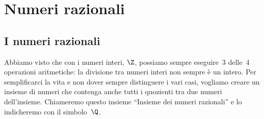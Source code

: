


%


\renewcommand{\cancelto}[3][]
  {\tikz[baseline=(N.base)]{
    \node[main node](N){$#2$};
    \node[label node,#1, anchor=south west] at (N.north east){$#3$};
    \draw[strike out,-latex,#1]  (N.south west) -- (N.north east);
  }
}

\newcommand{\bcancelto}[3][]
  {\tikz[baseline=(N.base)]{
    \node[main node](N){$#2$};
    \node[label node,#1, anchor=north west] at (N.south east){$#3$};
    \draw[strike out,-latex,#1]  (N.north west) -- (N.south east);
  }
}


\chapter{Numeri razionali}

\section{I numeri razionali}
\label{sec:razionali_razionali}

%

Abbiamo visto che con i numeri interi, \(\Z\), possiamo sempre eseguire~3
delle~4 operazioni aritmetiche: la divisione tra numeri interi non sempre è
un intero. Per semplificarci la vita e non dover sempre distinguere i vari
casi, vogliamo creare un insieme di numeri che contenga anche tutti i
quozienti tra due numeri dell'insieme.
Chiameremo questo insieme ``Insieme dei numeri razionali'' e lo
indicheremo con il simbolo~\(\Q\).


